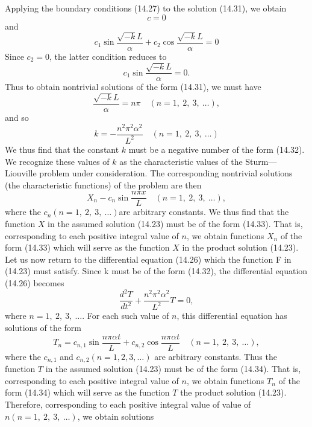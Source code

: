 \documentclass[11pt,a4paper, twoside]{report}
\begin{document}
	Applying the boundary conditions (14.27) to the solution (14.31), we obtain
	$$
	c = 0
	$$
	and
	$$
	c_1 \sin \frac{\sqrt{-k}L}{\alpha} + c_2 \cos \frac{\sqrt{-k}L}{\alpha} = 0
	$$
	Since $c_2 = 0$, the latter condition reduces to
	$$
	c_1 \sin \frac{\sqrt{-k}L}{\alpha} = 0.
	$$
	Thus to obtain nontrivial solutions of the form (14.31), we must have
	$$
	\frac{\sqrt{-k}L}{\alpha} = n\pi \quad (n = 1,\ 2,\ 3,\ \ldots),
	$$
	and so
	\begin{equation}\tag{14.32}\label{14.32}
		k = -\frac{n^2\pi^2\alpha^2}{L^2}\quad (n = 1,\ 2,\ 3,\ \ldots)
	\end{equation}
	We thus find that the constant $k$ must be a negative number of the form (14.32). We recognize these values of $k$ as the characteristic values of the Sturm—Liouville problem under consideration. The corresponding nontrivial solutions (the characteristic functions) of the problem are then
	\begin{equation}\tag{14.33}\label{14.33}
		X_n - c_n \sin \frac{n\pi x}{L}\quad (n = 1,\ 2,\ 3,\ \ldots),
	\end{equation}
	where the $c_n(n = 1,\ 2,\ 3,\ \ldots)$are arbitrary constants. We thus find that the function $X$ in the assumed solution (14.23) must be of the form (14.33). That is, corresponding to each positive integral value of $n$, we obtain functions $X_n$ of the form (14.33) which will serve as the function $X$ in the product solution (14.23).\\
	Let us now return to the differential equation (14.26) which the function F in (14.23) must satisfy. Since k must be of the form (14.32), the differential equation (14.26) becomes
	$$
	\frac{d^2 T}{dt^2} + \frac{n^2 \pi^2 \alpha^2}{L^2}T = 0,
	$$
	where $n = 1,\ 2,\ 3,\ \ldots$. For each such value of $n$, this differential equation has solutions of the form
	\begin{equation}\tag{14.34}\label{14.34}
		T_n = c_{n, 1}\sin \frac{n \pi \alpha t}{L} + c_{n, 2}\cos \frac{n \pi \alpha t}{L}\quad (n = 1,\ 2,\ 3,\ \ldots),
	\end{equation}
	where the $c_{n, 1}$ and $c_{n, 2}(n = 1, 2, 3,\ldots)$ are arbitrary constants. Thus the function $T$ in the assumed solution (14.23) must be of the form (14.34). That is, corresponding to each positive integral value of $n$, we obtain functions $T_n$ of the form (14.34) which will serve as the function $T$ the product solution (14.23).\\
	Therefore, corresponding to each positive integral value of value of $n(n = 1,\ 2,\ 3,\ \ldots)$, we obtain solutions
\end{document}
